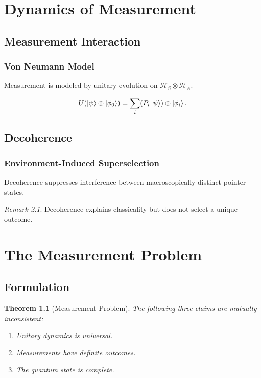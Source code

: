 \documentclass[12pt]{book}
\theoremstyle{plain}
\newtheorem{theorem}{Theorem}[chapter]
\theoremstyle{definition}
\theoremstyle{remark}
\newtheorem{remark}[theorem]{Remark}
\begin{document}
\part{Dynamics of Measurement}

\chapter{Measurement Interaction}

\section{Von Neumann Model}
Measurement is modeled by unitary evolution on $\mathcal{H}_S \otimes \mathcal{H}_A$.

\begin{equation}
U(\ket{\psi}\otimes\ket{\phi_0}) = \sum_i (P_i \ket{\psi}) \otimes \ket{\phi_i}.
\end{equation}

\chapter{Decoherence}

\section{Environment-Induced Superselection}
Decoherence suppresses interference between macroscopically distinct pointer states.

\begin{remark}
Decoherence explains classicality but does not select a unique outcome.
\end{remark}

\part{The Measurement Problem}

\chapter{Formulation}

\begin{theorem}[Measurement Problem]
The following three claims are mutually inconsistent:
\begin{enumerate}[label=(\roman*)]
\item Unitary dynamics is universal.
\item Measurements have definite outcomes.
\item The quantum state is complete.
\end{enumerate}
\end{theorem}
\end{document}
